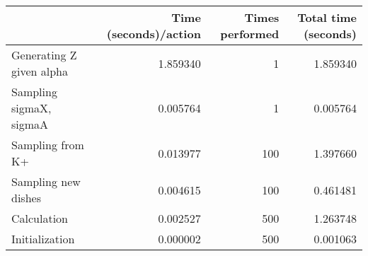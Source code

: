 \begin{tabular}{lrrr}
\toprule
{} &  Time (seconds)/action &  Times performed &  Total time (seconds) \\
\midrule
Generating Z given alpha &               1.859340 &                1 &              1.859340 \\
Sampling sigmaX, sigmaA  &               0.005764 &                1 &              0.005764 \\
Sampling from K+         &               0.013977 &              100 &              1.397660 \\
Sampling new dishes      &               0.004615 &              100 &              0.461481 \\
Calculation              &               0.002527 &              500 &              1.263748 \\
Initialization           &               0.000002 &              500 &              0.001063 \\
\bottomrule
\end{tabular}
